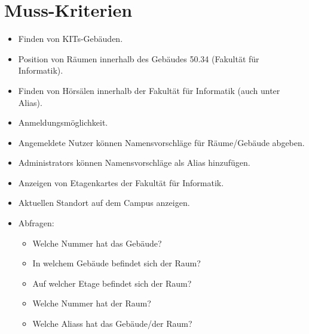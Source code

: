 \section{Muss-Kriterien}

\begin{itemize}

    \item Finden von \Glspl{KIT}-Gebäuden.
    \item Position von Räumen innerhalb des Gebäudes 50.34 (Fakultät für Informatik).
    \item Finden von Hörsälen innerhalb der Fakultät für Informatik (auch unter Alias).
    \item Anmeldungsmöglichkeit.
    \item Angemeldete Nutzer können Namensvorschläge für Räume/Gebäude abgeben.
    \item \Glspl{Administrator} können Namensvorschläge als \Gls{Alias} hinzufügen.
    \item Anzeigen von \Glspl{Etagenkarte} der Fakultät für Informatik.
    \item Aktuellen Standort auf dem \Gls{Campus} anzeigen.
    \item Abfragen:
        \begin{itemize}
            \item Welche Nummer hat das Gebäude?
            \item In welchem Gebäude befindet sich der Raum?
            \item Auf welcher Etage befindet sich der Raum?
            \item Welche Nummer hat der Raum?
            \item Welche \Glspl{Alias} hat das Gebäude/der Raum?
        \end{itemize}

\end{itemize}
